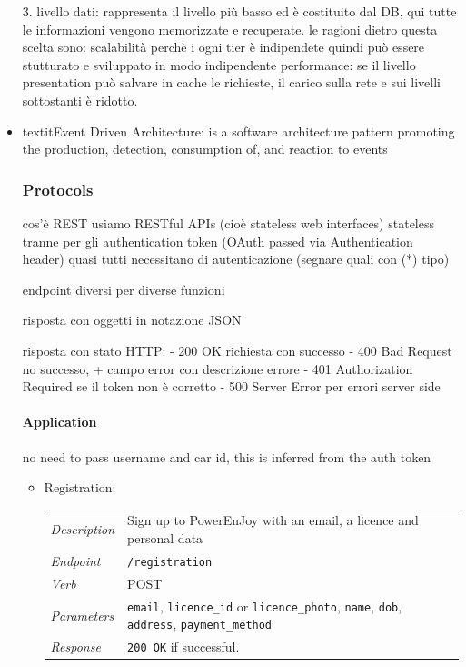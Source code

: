 \documentclass[english]{article}
\newcommand{\code}[1]{\texttt{#1}}
\begin{document}
\begin{itemize}
{                                        3. livello dati: rappresenta il livello più basso ed è costituito dal DB, qui tutte le informazioni vengono memorizzate e recuperate.
                                        le ragioni dietro questa scelta sono: scalabilità perchè i ogni tier è indipendete quindi può essere stutturato e sviluppato in modo indipendente
                                                                              performance: se il livello presentation può salvare in cache le richieste, il carico sulla rete e sui livelli sottostanti è ridotto.}
\item{textit{Event Driven Architecture}: is a software architecture pattern promoting the production, detection, consumption of, and reaction to events}
\subsubsection{Protocols}

cos'è REST
usiamo RESTful APIs (cioè stateless web interfaces)
stateless tranne per gli authentication token (OAuth passed via Authentication header)
quasi tutti necessitano di autenticazione (segnare quali con (*) tipo)

endpoint diversi per diverse funzioni

risposta con oggetti in notazione JSON

risposta con stato HTTP:
- 200 OK richiesta con successo
- 400 Bad Request no successo, + campo error con descrizione errore
- 401 Authorization Required se il token non è corretto
- 500 Server Error per errori server side

\paragraph{Application}
no need to pass username and car id, this is inferred from the auth token


\begin{itemize}
	\item{Registration:}\\
	\begin{tabular}{ | l l }
		\textit{Description} & Sign up to PowerEnJoy with an email, a licence and personal data \\
		\textit{Endpoint} & \code{/registration} \\ 
		\textit{Verb} & POST \\  
		\textit{Parameters} & \code{email}, \code{licence\_id} or \code{licence\_photo}, \code{name}, \code{dob}, \code{address}, \code{payment\_method} \\
		\textit{Response} & \code{200 OK} if successful.		
	\end{tabular}
	

\end{itemize}
\end{itemize}
\end{document}
